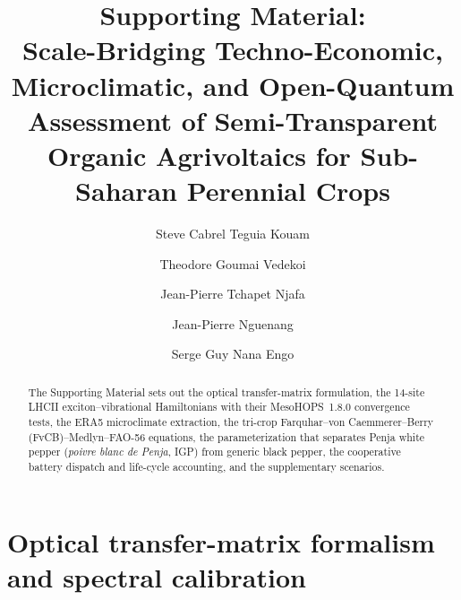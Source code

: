 \documentclass[preprint,12pt,a4paper]{elsarticle}
\begin{document}
\begin{frontmatter}
\title{Supporting Material:\\Scale-Bridging Techno-Economic, Microclimatic, and Open-Quantum Assessment of Semi-Transparent Organic Agrivoltaics for Sub-Saharan Perennial Crops}

\author[udla]{Steve Cabrel Teguia Kouam}
\author[uy1]{Theodore Goumai Vedekoi}
\author[uy1]{Jean-Pierre Tchapet Njafa}
\author[udla]{Jean-Pierre Nguenang}
\author[uy1]{Serge Guy Nana Engo}

\address[udla]{Department of Physics, Faculty of Science, University of Douala, P.O. Box 24157, Douala, Cameroon}
\address[uy1]{Department of Physics, Faculty of Science, University of Yaound\'e~I, P.O. Box 812, Yaound\'e, Cameroon}

\begin{abstract}
The Supporting Material sets out the optical transfer-matrix formulation, the 14-site LHCII exciton--vibrational Hamiltonians with their MesoHOPS~1.8.0 convergence tests, the ERA5 microclimate extraction, the tri-crop Farquhar--von Caemmerer--Berry (FvCB)--Medlyn--FAO-56 equations, the parameterization that separates Penja white pepper (\textit{poivre blanc de Penja}, IGP) from generic black pepper, the cooperative battery dispatch and life-cycle accounting, and the supplementary scenarios.
\end{abstract}
\end{frontmatter}

\section{Optical transfer-matrix formalism and spectral calibration}
\label{sec:sm_tmm}
\end{document}
